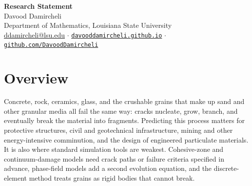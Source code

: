 \documentclass[11pt]{article}
\begin{document}
\begin{center}
{\LARGE\bfseries Research Statement}\\[3pt]
{\large Davood Damircheli}\\[1pt]
{\small Department of Mathematics, Louisiana State University\\
\href{mailto:ddamircheli@lsu.edu}{ddamircheli@lsu.edu} \;$\cdot$\;
\href{https://davooddamircheli.github.io}{\nolinkurl{davooddamircheli.github.io}} \;$\cdot$\;
\href{https://github.com/DavoodDamircheli}{\nolinkurl{github.com/DavoodDamircheli}}}
\end{center}
\vspace{-4pt}

\section*{Overview}

Concrete, rock, ceramics, glass, and the crushable grains that make up sand and
other granular media all fail the same way: cracks nucleate, grow, branch, and
eventually break the material into fragments. Predicting this process matters
for protective structures, civil and geotechnical infrastructure, mining and
other energy-intensive comminution, and the design of engineered particulate
materials. It is also where standard simulation tools are weakest. Cohesive-zone
and continuum-damage models need crack paths or failure criteria specified in
advance, phase-field models add a second evolution equation, and the
discrete-element method treats grains as rigid bodies that cannot break.
\end{document}
